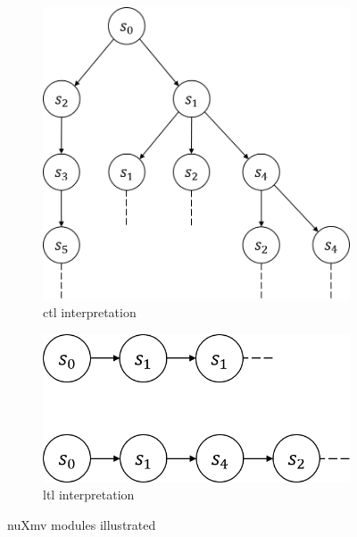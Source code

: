 \begin{figure}
\begin{subfigure}[b]{\subfigw}
        \includegraphics[scale=\figscale]{figures/ctl-interpretation.png}
        \caption{\gls{ctl} interpretation}
        \label{fig:ctl-int}
    \end{subfigure}
    \begin{subfigure}[b]{\subfigw}
        \centering
        \includegraphics[scale=\figscale]{figures/ltl-interpretation.png}
        \caption{\gls{ltl} interpretation}
    \end{subfigure}
    \caption{nuXmv modules illustrated}
\end{figure}


